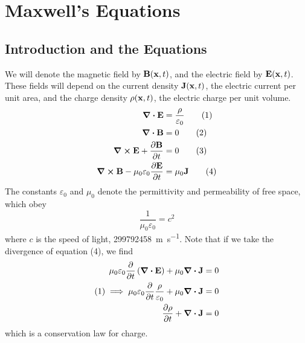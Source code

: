 \documentclass{article}
\begin{document}
\section{Maxwell's Equations}
\subsection{Introduction and the Equations}
We will denote the magnetic field by $\vb B(\vb x, t)$, and the electric field by $\vb E(\vb x, t)$. These fields will depend on the current density $\vb J(\vb x, t)$, the electric current per unit area, and the charge density $\rho(\vb x, t)$, the electric charge per unit volume.
\begin{align}
	\div{\vb E}                                      & = \frac{\rho}{\varepsilon_0} \tag{1} \\
	\div{\vb B}                                      & = 0                          \tag{2} \\
	\curl{\vb E} + \pdv{\vb B}{t}                    & = 0                          \tag{3} \\
	\curl{\vb B} - \mu_0\varepsilon_0 \pdv{\vb E}{t} & = \mu_0 \vb J \tag{4}
\end{align}
The constants $\varepsilon_0$ and $\mu_0$ denote the permittivity and permeability of free space, which obey
\[ \frac{1}{\mu_0 \varepsilon_0} = c^2 \]
where $c$ is the speed of light, \SI{299792458}{\metre\per\second}. Note that if we take the divergence of equation (4), we find
\begin{align*}
	\mu_0 \varepsilon_0 \pdv{t}\left( \div{\vb E} \right) + \mu_0 \div{\vb J}              & = 0 \\
	(1) \implies \mu_0 \varepsilon_0 \pdv{t}\frac{\rho}{\varepsilon_0} + \mu_0 \div{\vb J} & = 0 \\
	\pdv{\rho}{t} + \div{\vb J}                                                            & = 0 \\
\end{align*}
which is a conservation law for charge.
\end{document}

